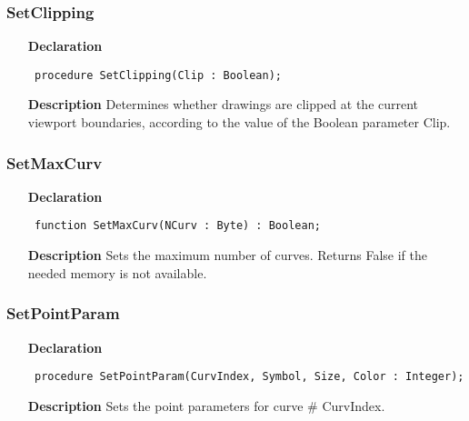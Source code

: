 \documentclass[12pt,a4paper,oneside]{report}
\newcommand{\declarationitem}[1]{\textbf{#1}}
\newcommand{\descriptiontitle}[1]{\textbf{#1}}
\newcommand{\code}[1]{\texttt{#1}}
\begin{document}
\subsubsection{SetClipping}
\label{uplot-SetClipping}
\begin{itemize}\item[\declarationitem{Declaration}\hfill]
	\begin{flushleft}
		\code{
			procedure SetClipping(Clip : Boolean);}
		
	\end{flushleft}
	
	\par
	\item[\descriptiontitle{Description}]
	Determines whether drawings are clipped at the current viewport boundaries, according to the value of the Boolean parameter Clip.
	
\end{itemize}
\subsubsection{SetMaxCurv}
\label{uplot-SetMaxCurv}
\begin{itemize}\item[\declarationitem{Declaration}\hfill]
	\begin{flushleft}
		\code{
			function SetMaxCurv(NCurv : Byte) : Boolean;}
		
	\end{flushleft}
	
	\par
	\item[\descriptiontitle{Description}]
	Sets the maximum number of curves. Returns False if the needed memory is not available.
	
\end{itemize}
\subsubsection{SetPointParam}
\label{uplot-SetPointParam}
\begin{itemize}\item[\declarationitem{Declaration}\hfill]
	\begin{flushleft}
		\code{
			procedure SetPointParam(CurvIndex, Symbol, Size, Color : Integer);}
		
	\end{flushleft}
	
	\par
	\item[\descriptiontitle{Description}]
	Sets the point parameters for curve {\#} CurvIndex.
	
\end{itemize}
\end{document}
